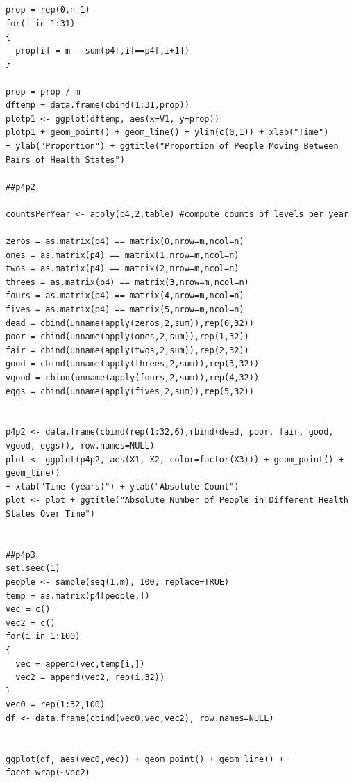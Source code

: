 \documentclass[11pt]{article}
\begin{document}
\begin{verbatim}
prop = rep(0,n-1)
for(i in 1:31)
{
  prop[i] = m - sum(p4[,i]==p4[,i+1])
}

prop = prop / m
dftemp = data.frame(cbind(1:31,prop))
plotp1 <- ggplot(dftemp, aes(x=V1, y=prop))
plotp1 + geom_point() + geom_line() + ylim(c(0,1)) + xlab("Time") 
+ ylab("Proportion") + ggtitle("Proportion of People Moving Between Pairs of Health States")

##p4p2

countsPerYear <- apply(p4,2,table) #compute counts of levels per year

zeros = as.matrix(p4) == matrix(0,nrow=m,ncol=n)
ones = as.matrix(p4) == matrix(1,nrow=m,ncol=n)
twos = as.matrix(p4) == matrix(2,nrow=m,ncol=n)
threes = as.matrix(p4) == matrix(3,nrow=m,ncol=n)
fours = as.matrix(p4) == matrix(4,nrow=m,ncol=n)
fives = as.matrix(p4) == matrix(5,nrow=m,ncol=n)
dead = cbind(unname(apply(zeros,2,sum)),rep(0,32))
poor = cbind(unname(apply(ones,2,sum)),rep(1,32))
fair = cbind(unname(apply(twos,2,sum)),rep(2,32))
good = cbind(unname(apply(threes,2,sum)),rep(3,32))
vgood = cbind(unname(apply(fours,2,sum)),rep(4,32))
eggs = cbind(unname(apply(fives,2,sum)),rep(5,32))


p4p2 <- data.frame(cbind(rep(1:32,6),rbind(dead, poor, fair, good, vgood, eggs)), row.names=NULL)
plot <- ggplot(p4p2, aes(X1, X2, color=factor(X3))) + geom_point() + geom_line() 
+ xlab("Time (years)") + ylab("Absolute Count")
plot <- plot + ggtitle("Absolute Number of People in Different Health States Over Time")


##p4p3
set.seed(1)
people <- sample(seq(1,m), 100, replace=TRUE)
temp = as.matrix(p4[people,])
vec = c()
vec2 = c()
for(i in 1:100)
{
  vec = append(vec,temp[i,])
  vec2 = append(vec2, rep(i,32))
}
vec0 = rep(1:32,100)
df <- data.frame(cbind(vec0,vec,vec2), row.names=NULL)


ggplot(df, aes(vec0,vec)) + geom_point() + geom_line() + facet_wrap(~vec2)
\end{verbatim}
\end{document}
